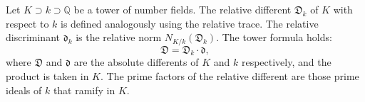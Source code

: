 Let $K \supset k \supset \mathbb{Q}$ be a tower of number fields. The relative different $\mathfrak{D}_k$ of $K$ with respect to $k$ is defined analogously using the relative trace. The relative discriminant $\mathfrak{d}_k$ is the relative norm $N_{K/k}(\mathfrak{D}_k)$. The tower formula holds:
$$\mathfrak{D} = \mathfrak{D}_k \cdot \mathfrak{d},$$
where $\mathfrak{D}$ and $\mathfrak{d}$ are the absolute differents of $K$ and $k$ respectively, and the product is taken in $K$. The prime factors of the relative different are those prime ideals of $k$ that ramify in $K$.
